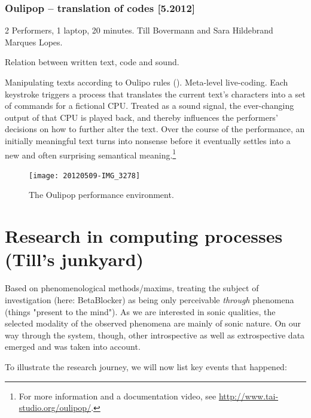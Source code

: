 \documentclass[letterpaper, 12pt]{article}
\begin{document}


\subsubsection{Oulipop -- translation of codes [5.2012]}
\label{sub:oulipop}
2 Performers, 1 laptop, 20 minutes. Till Bovermann and Sara Hildebrand Marques Lopes.

Relation between written text, code and sound.

Manipulating texts according to Oulipo rules (\cite{mathews2005-oul}).
Meta-level live-coding. 
Each keystroke triggers a process that translates the current text's characters into a set of commands for a fictional CPU. 
Treated as a sound signal, the ever-changing output of that CPU is played back, and thereby influences the performers' decisions on how to further alter the text. 
Over the course of the performance, an initially meaningful text turns into nonsense before it eventually settles into a new and often surprising semantical meaning.\footnote{For more information and a documentation video, see \url{http://www.tai-studio.org/oulipop/}.}
\begin{figure}
	\centering
		\texttt{[image: 20120509-IMG\_3278]}
	\caption{The Oulipop performance environment.}
	\label{fig:fig_20120509-IMG_3278}
\end{figure}


\section{Research in computing processes (Till's junkyard)}
\label{sub:research_in_computing_processes}

Based on phenomenological methods/maxims, treating the subject of investigation (here: BetaBlocker) as being only perceivable \emph{through} phenomena (things "present to the mind"). 
As we are interested in sonic qualities, the selected modality of the observed phenomena are mainly of sonic nature.
On our way through the system, though, other introspective as well as extrospective data emerged and was taken into account.

To illustrate the research journey, we will now list key events that happened:
\end{document}
